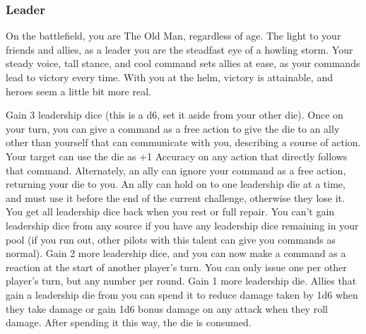 \subsubsection{Leader}

\begin{talent}
{On the battlefield, you are The Old Man, regardless of age. The light to your friends and allies, as a leader you are the steadfast eye of a howling storm. Your steady voice, tall stance, and cool command sets allies at ease, as your commands lead to victory every time. With you at the helm, victory is attainable, and heroes seem a little bit more real.}

Gain 3 leadership dice (this is a d6, set it aside from your other die). Once on your turn, you can give a command as a free action to give the die to an ally other than yourself that can communicate with you, describing a course of action. Your target can use the die as +1 Accuracy on any action that directly follows that command. Alternately, an ally can ignore your command as a free action, returning your die to you. 
An ally can hold on to one leadership die at a time, and must use it before the end of the current challenge, otherwise they lose it. You get all leadership dice back when you rest or full repair. You can’t gain leadership dice from any source if you have any leadership dice remaining in your pool (if you run out, other pilots with this talent can give you commands as normal). 
Gain 2 more leadership dice, and you can now make a command as a reaction at the start of another player’s turn. You can only issue one per other player’s turn, but any number per round. 
Gain 1 more leadership die. Allies that gain a leadership die from you can spend it to reduce damage taken by 1d6 when they take damage or gain 1d6 bonus damage on any attack when they roll damage. After spending it this way, the die is consumed.
\end{talent}
